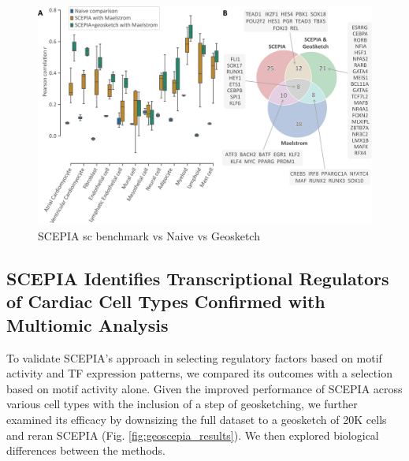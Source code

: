 \begin{figure}
    \centering
    \includegraphics[width=0.75\linewidth]{ch.scepia/imgs/Fig_OverlappingHitsBetweenSCEPIAGEOANDMAELSTROM_v7.png}
    \caption{SCEPIA sc benchmark vs Naive vs Geosketch}
    \label{fig:sc_benchmark}
\end{figure}

\subsection{SCEPIA Identifies Transcriptional Regulators of Cardiac Cell Types Confirmed with Multiomic Analysis}

To validate SCEPIA's approach in selecting regulatory factors based on motif activity and TF expression patterns, we compared its outcomes with a selection based on motif activity alone. Given the improved performance of SCEPIA across various cell types with the inclusion of a step of geosketching, we further examined its efficacy by downsizing the full dataset to a geosketch of 20K cells and reran SCEPIA (Fig. \ref{fig:geoscepia_results}). We then explored biological differences between the methods.

